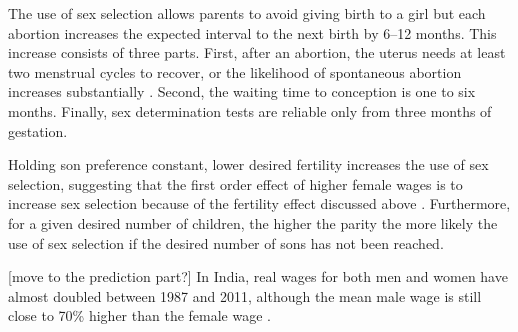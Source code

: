 The use of sex selection allows parents to avoid giving birth to a girl but each
abortion increases the expected interval to the next birth by 6--12 months.
This increase consists of three parts. 
First, after an abortion, the uterus needs at least two menstrual cycles to recover, 
or the likelihood of spontaneous abortion increases substantially \citep{zhou00b}. 
Second, the waiting time to conception is one to six months. 
Finally, sex determination tests are reliable only from three months of gestation. 

Holding son preference constant, lower desired fertility increases the use of sex 
selection, suggesting that the first order effect of higher female wages is to increase 
sex selection because of the fertility effect discussed above \citep{Portner2015b,Jayachandran2017}.  
Furthermore, for a given desired number of children, the higher the parity the more 
likely the use of sex selection if the desired number of sons has not been reached.










[move to the prediction part?]
In India, real wages for both men and women have almost doubled between 1987 and 
2011, although the mean male wage is still close to 70\% higher than the female wage 
\citep{Klasen2015,Bhargava2018}.






